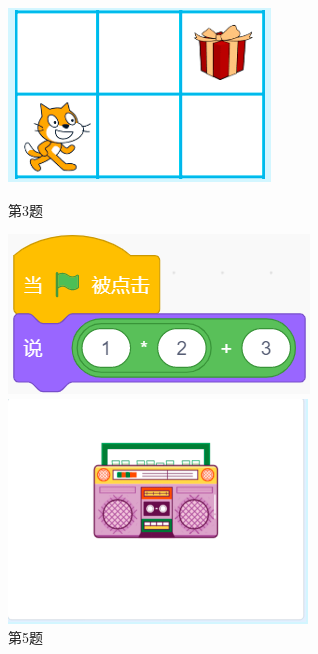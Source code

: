\documentclass[10pt, a4paper]{article}
\begin{document}
\begin{enumerate}
        \begin{figure}[htbp]
            \centering
            \begin{minipage}[t]{.16\textwidth}
                \centering
                \includegraphics[width=\textwidth]{3.png}
                \caption*{第3题}
            \end{minipage}
            \begin{minipage}[t]{.2\textwidth}
                \centering
                \includegraphics[width=\textwidth]{5.png}
                \caption*{第5题}
            \end{minipage}
            \begin{minipage}[t]{.16\textwidth}
                \centering
                \includegraphics[width=\textwidth]{6.png}

\end{minipage}
\end{figure}
\end{enumerate}
\end{document}
